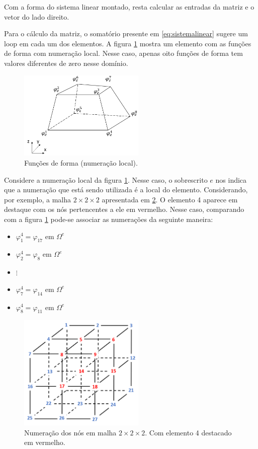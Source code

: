 Com a forma do sistema linear montado, resta calcular as entradas da matriz e o vetor do lado direito.

Para o cálculo da matriz, o somatório presente em \ref{eq:sistemalinear} sugere um loop em cada um dos elementos. A figura \ref{fig:elem_func_form_local} mostra um elemento com as funções de forma com numeração local. Nesse caso, apenas oito funções de forma tem valores diferentes de zero nesse domínio.

\begin{figure}[!htbp]
\label{fig:elem_func_form_local}
\centering
\includegraphics[width=6cm]{chap01/elemento_original_func_forma.png}
\caption{Funções de forma (numeração local).}
\end{figure}


Considere a numeração local da figura \ref{fig:elem_func_form_local}. Nesse caso, o sobrescrito $e$ nos indica que a numeração que está sendo utilizada é a local do elemento. Considerando, por exemplo, a malha $2\times2\times2$ apresentada em \ref{fig:grid2x2_elem3_vermelho}. O elemento 4 aparece em destaque com os nós pertencentes a ele em vermelho. Nesse caso, comparando com a figura \ref{fig:elem_func_form_local} pode-se associar as numerações da seguinte maneira:

\begin{itemize}
   \item $\varphi^4_1=\varphi_{17}$ em $\Omega^e$
   \item $\varphi^4_2=\varphi_{8}$ em $\Omega^e$
   \item $\vdots$
   \item $\varphi^4_7=\varphi_{14}$ em $\Omega^e$
   \item $\varphi^4_8=\varphi_{11}$ em $\Omega^e$
\end{itemize}



\begin{figure}[!htbp]
\label{fig:grid2x2_elem3_vermelho}
\centering
\includegraphics[width=6cm]{chap01/grid2x2_elem3_vermelho.png}
\caption{Numeração dos nós em malha $2\times2\times2$. Com elemento 4 destacado em vermelho.}
\end{figure}


